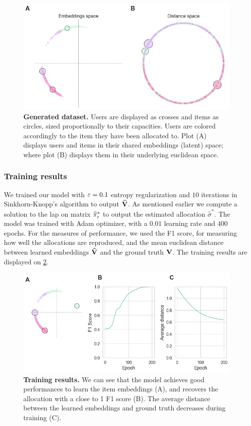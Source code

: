 \begin{figure}[h]
    \centering
    \includegraphics[width=.9\columnwidth]{images/simca/dataset.png}
    \caption{ \textbf{Generated dataset.} Users are displayed as crosses and
        items as circles, sized proportionally to their capacities. Users are
        colored accordingly to the item they have been allocated to. Plot (A)
        displays users and items in their shared embeddings (latent) space;
        where plot (B) displays them in their underlying euclidean space. }
    \label{fig:toy_dataset}
\end{figure}

\subsubsection*{Training results}
We trained our model with $\varepsilon=0.1$ entropy regularization and $10$ iterations
in Sinkhorn-Knopp's algorithm to output $\widehat{\mathbf{V}}$. As mentioned earlier we
compute a solution to the \ac{lap} on matrix $\widehat{\pi}^*_{\varepsilon}$ to output
the estimated allocation $\widehat{\sigma}^*$. The model was trained with Adam
optimizer, with a $0.01$ learning rate and $400$ epochs. For the measures of
performance, we used the F1 score, for measuring how well the allocations are
reproduced, and the mean euclidean distance between learned embeddings
$\widehat{\mathbf{V}}$ and the ground truth $\mathbf{V}$. The training results are displayed
on \cref{fig:learned_embeddings}.

\begin{figure}[h]
    \centering
    \includegraphics[width=.9\columnwidth]{images/simca/learned_embeddings.png}
    \caption{ \textbf{Training results.} We can see that the model achieves good
        performances to learn the item embeddings (A), and recovers the
        allocation with a close to 1 F1 score (B). The average distance between
        the learned embeddings and ground truth decreases during training (C). }
    \label{fig:learned_embeddings}
\end{figure}


